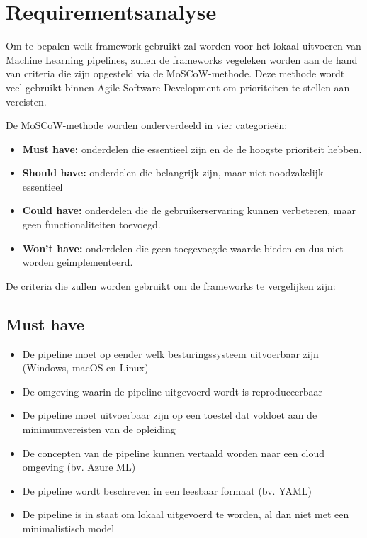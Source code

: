 \section{Requirementsanalyse}
\label{s:Requirementsanalyse}
Om te bepalen welk framework gebruikt zal worden voor het lokaal uitvoeren van Machine Learning pipelines, zullen de frameworks vegeleken worden aan de hand van criteria die zijn opgesteld via de MoSCoW-methode. Deze methode wordt veel gebruikt binnen Agile Software Development om prioriteiten te stellen aan vereisten.

De MoSCoW-methode worden onderverdeeld in vier categorieën:
\begin{itemize}
    \item \textbf{Must have:} onderdelen die essentieel zijn en de de hoogste prioriteit hebben.
    \item \textbf{Should have:} onderdelen die belangrijk zijn, maar niet noodzakelijk essentieel
    \item \textbf{Could have:} onderdelen die de gebruikerservaring kunnen verbeteren, maar geen functionaliteiten toevoegd.
    \item \textbf{ Won't have:} onderdelen die geen toegevoegde waarde bieden en dus niet worden geimplementeerd.
\end{itemize}

De criteria die zullen worden gebruikt om de frameworks te vergelijken zijn:

\subsection*{Must have}

\begin{itemize}
    \item De pipeline moet op eender welk besturingssysteem uitvoerbaar zijn (Windows, macOS en Linux)
    \item De omgeving waarin de pipeline uitgevoerd wordt is reproduceerbaar
    \item De pipeline moet uitvoerbaar zijn op een toestel dat voldoet aan de minimumvereisten van de opleiding
    \item De concepten van de pipeline kunnen vertaald worden naar een cloud omgeving (bv. Azure ML)
    \item De pipeline wordt beschreven in een leesbaar formaat (bv. YAML)
    \item De pipeline is in staat om lokaal uitgevoerd te worden, al dan niet met een minimalistisch model
\end{itemize}



